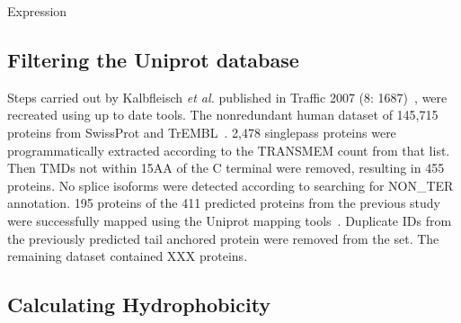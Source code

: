 Expression
\subsection{Filtering the Uniprot database}
Steps carried out by Kalbfleisch {\it et al.} published in Traffic 2007 (8: 1687)~\cite{Kalbfleisch2007}, were recreated using up to date tools. The non\-redundant human dataset of 145,715 proteins from SwissProt and TrEMBL~\cite{TheUniProtConsortium2014}. 2,478 singlepass proteins were programmatically extracted according to the TRANSMEM count from that list. Then TMDs not within 15AA of the C terminal were removed, resulting in 455 proteins. No splice isoforms were detected according to searching for NON\_TER annotation. 195 proteins of the 411 predicted proteins from the previous study were successfully mapped using the Uniprot mapping tools~\cite{TheUniProtConsortium2014}. Duplicate IDs from the previously predicted tail anchored protein were removed from the set. The remaining dataset contained XXX proteins.

\subsection{Calculating Hydrophobicity}

